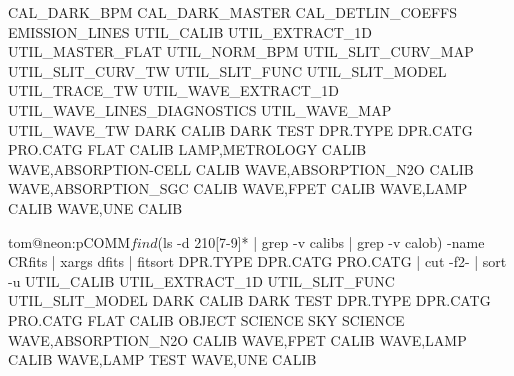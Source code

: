                                         CAL_DARK_BPM               
                                        CAL_DARK_MASTER            
                                        CAL_DETLIN_COEFFS          
                                        EMISSION_LINES             
                                        UTIL_CALIB                 
                                        UTIL_EXTRACT_1D            
                                        UTIL_MASTER_FLAT           
                                        UTIL_NORM_BPM              
                                        UTIL_SLIT_CURV_MAP         
                                        UTIL_SLIT_CURV_TW          
                                        UTIL_SLIT_FUNC             
                                        UTIL_SLIT_MODEL            
                                        UTIL_TRACE_TW              
                                        UTIL_WAVE_EXTRACT_1D       
                                        UTIL_WAVE_LINES_DIAGNOSTICS
                                        UTIL_WAVE_MAP              
                                        UTIL_WAVE_TW               
DARK                    CALIB                                      
DARK                    TEST                                       
DPR.TYPE                DPR.CATG        PRO.CATG                   
FLAT                    CALIB                                      
LAMP,METROLOGY          CALIB                                      
WAVE,ABSORPTION-CELL    CALIB                                      
WAVE,ABSORPTION_N2O     CALIB                                      
WAVE,ABSORPTION_SGC     CALIB                                      
WAVE,FPET               CALIB                                      
WAVE,LAMP               CALIB                                      
WAVE,UNE                CALIB                                      


tom@neon:pCOMM$ find $(ls -d 210[7-9]* | grep -v calibs | grep -v calob) -name CR\*fits | xargs dfits | fitsort DPR.TYPE DPR.CATG PRO.CATG | cut -f2- | sort -u
                                        UTIL_CALIB     
                                        UTIL_EXTRACT_1D
                                        UTIL_SLIT_FUNC 
                                        UTIL_SLIT_MODEL
DARK                    CALIB                          
DARK                    TEST                           
DPR.TYPE                DPR.CATG        PRO.CATG       
FLAT                    CALIB                          
OBJECT                  SCIENCE                        
SKY                     SCIENCE                        
WAVE,ABSORPTION_N2O     CALIB                          
WAVE,FPET               CALIB                          
WAVE,LAMP               CALIB                          
WAVE,LAMP               TEST                           
WAVE,UNE                CALIB                          
